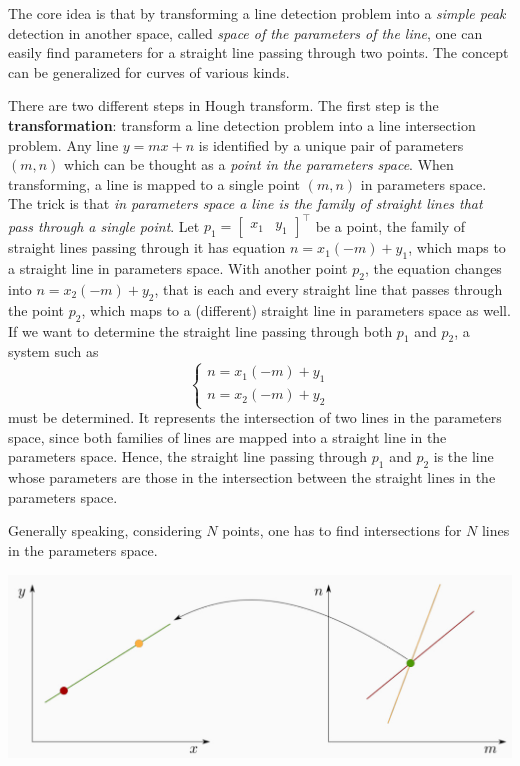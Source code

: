 \documentclass[10pt]{report}
\begin{document}
The core idea is that by transforming a line detection problem into a
\emph{simple peak} detection in another space, called \emph{space of the
parameters of the line}, one can easily find parameters for a straight
line passing through two points. The concept can be generalized for
curves of various kinds.

There are two different steps in Hough transform. The first step is the
\textbf{transformation}: transform a line detection problem into a line
intersection problem. Any line \(y = mx + n\) is identified by a unique
pair of parameters \((m,n)\) which can be thought as a \emph{point in the
parameters space}. When transforming, a line is mapped to a single point
\((m,n)\) in parameters space. The trick is that \emph{in parameters space a
line is the family of straight lines that pass through a single point}.
Let \(p_1 = \begin{bmatrix}x_1 & y_1\end{bmatrix}^\top\) be a point, the
family of straight lines passing through it has equation
\(n = x_1(-m) + y_1\), which maps to a straight line in parameters
space. With another point \(p_2\), the equation changes into
\(n = x_2(-m) + y_2\), that is each and every straight line that passes
through the point \(p_2\), which maps to a (different) straight line in
parameters space as well. If we want to determine the straight line
passing through both \(p_1\) and \(p_2\), a system such as
\[\left\{\begin{array}{l} n = x_1(-m) + y_1\\ n = x_2(-m) + y_2\end{array}\right.\]
must be determined. It represents the intersection of two lines in the
parameters space, since both families of lines are mapped into a
straight line in the parameters space. Hence, the straight line passing
through \(p_1\) and \(p_2\) is the line whose parameters are those in
the intersection between the straight lines in the parameters space.

Generally speaking, considering \(N\) points, one has to find
intersections for \(N\) lines in the parameters space.

\begin{center}
\includegraphics[width=.9\linewidth]{./pics/fit/hough-line-transform.jpg}
\end{center}
\end{document}

